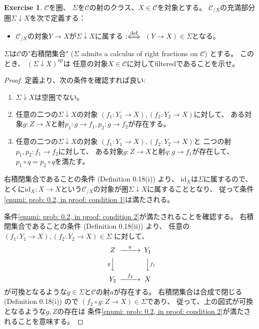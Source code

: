 \documentclass[uplatex]{jsarticle}
\theoremstyle{definition}
\newtheorem{prob}[prob]{Exercise}
\def\id{\mathrm{id}}
\newcommand{\op}{\mathrm{op}}
\def\mcC{\mathcal{C}}
\newcommand{\deff}{:\hspace{-3pt}\overset{\text{def}}{\iff}}
\begin{document}
\begin{prob}\label{prob: 0.2}
  \(\mcC\)を圏、
  \(\Sigma\)を\(\mcC\)の射のクラス、\(X\in \mcC\)を対象とする。
  \(\mcC_{/X}\)の充満部分圏\(\Sigma\downarrow X\)を次で定義する：
  \begin{itemize}
    \item[ \ ]
    \(\mcC_{/X}\)の対象\(Y\to X\)が\(\Sigma\downarrow X\)に属する
    \(\deff\) \((Y\to X)\in \Sigma\)となる。
  \end{itemize}
  \(\Sigma\)は\(\mcC\)の"右積閉集合"
  (\(\Sigma\) admits a calculus of right fractions on \(\mcC\))
  とする。
  このとき、
  \((\Sigma\downarrow X)^{\op}\)は
  任意の対象\(X\in \mcC\)に対してfilteredであることを示せ。
\end{prob}

\begin{proof}
  定義より、次の条件を確認すれば良い:
  \begin{enumerate}
    \item \label{enumi: prob: 0.2, in proof: condition 1}
    \(\Sigma\downarrow X\)は空圏でない。
    \item \label{enumi: prob: 0.2, in proof: condition 2}
    任意の二つの\(\Sigma\downarrow X\)の対象
    \((f_1:Y_1\to X), (f_2:Y_2\to X)\)に対して、
    ある対象\(g:Z\to X\)と射\(p_1:g\to f_1, p_2:g\to f_2\)が存在する。
    \item \label{enumi: prob: 0.2, in proof: condition 3}
    任意の二つの\(\Sigma\downarrow X\)の対象
    \((f_1:Y_1\to X), (f_2:Y_2\to X)\)と
    二つの射\(p_1,p_2:f_1\to f_2\)に対して、
    ある対象\(g:Z\to X\)と射\(q:g\to f_1\)が存在して、
    \(p_1\circ q = p_2\circ q\)を満たす。
  \end{enumerate}
  右積閉集合であることの条件 (Definition 0.18(i)) より、
  \(\id_X\)は\(\Sigma\)に属するので、
  とくに\(\id_X:X\to X\)という\(\mcC_{/X}\)の対象が圏\(\Sigma\downarrow X\)に属することとなり、
  従って条件\ref{enumi: prob: 0.2, in proof: condition 1}は満たされる。

  条件\ref{enumi: prob: 0.2, in proof: condition 2}が満たされることを確認する。
  右積閉集合であることの条件 (Definition 0.18(ii)) より、
  任意の\((f_1:Y_1\to X), (f_2:Y_2\to X) \in \Sigma\)
  に対して、
  \[
  \begin{CD}
    Z @> a >> Y_1 \\
    @V g VV @VV f_1 V \\
    Y_2 @> f_2 >> X
  \end{CD}
  \]
  が可換となるような\(g\in \Sigma\)と\(\mcC\)の射\(a\)が存在する。
  右積閉集合は合成で閉じる (Definition 0.18(i)) ので
  \((f_2\circ g : Z\to X)\in \Sigma\)であり、
  従って、上の図式が可換となるような\(g,Z\)の存在は
  条件\ref{enumi: prob: 0.2, in proof: condition 2}が満たされることを意味する。


\end{proof}
\end{document}
